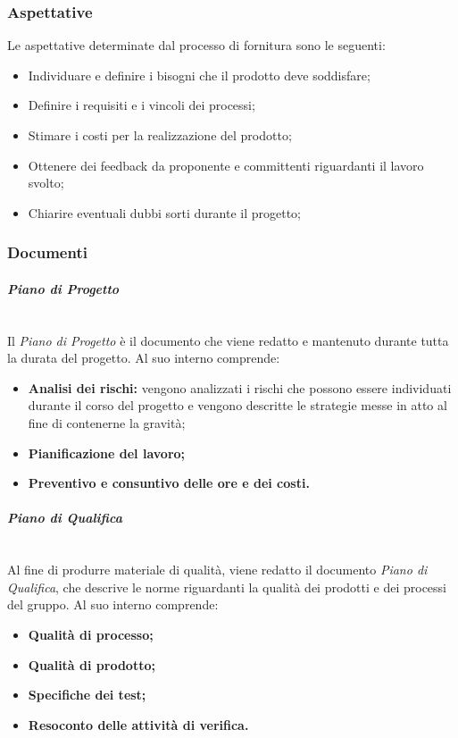 \documentclass[a4paper, 12pt]{article}
\begin{document}
\subsubsection{Aspettative}
Le aspettative determinate dal processo di fornitura sono le seguenti:
\begin{itemize}
    \item Individuare e definire i bisogni che il prodotto deve soddisfare;
    \item Definire i requisiti e i vincoli dei processi;
    \item Stimare i costi per la realizzazione del prodotto;
    \item Ottenere dei feedback da proponente e committenti riguardanti il
    lavoro svolto;
    \item Chiarire eventuali dubbi sorti durante il progetto;
\end{itemize}

\subsubsection{Documenti}
\paragraph{\textit{Piano di Progetto}}
\\
Il \textit{Piano di Progetto} è il documento che viene redatto e mantenuto
durante tutta la durata del progetto. Al suo interno comprende:
\begin{itemize}
    \item \textbf{Analisi dei rischi:} vengono analizzati i rischi che possono
    essere individuati durante il corso del progetto e vengono descritte le
    strategie messe in atto al fine di contenerne la gravità;
    \item \textbf{Pianificazione del lavoro;}
    \item \textbf{Preventivo e consuntivo delle ore e dei costi.}
\end{itemize}
\paragraph{\textit{Piano di Qualifica}}
\\
Al fine di produrre materiale di qualità, viene redatto il documento
\textit{Piano di Qualifica}, che descrive le norme riguardanti la qualità dei prodotti e dei
processi del gruppo. Al suo interno comprende:
\begin{itemize}
    \item \textbf{Qualità di processo;}
    \item \textbf{Qualità di prodotto;}
    \item \textbf{Specifiche dei test;}
    \item \textbf{Resoconto delle attività di verifica.}
\end{itemize}
\end{document}
